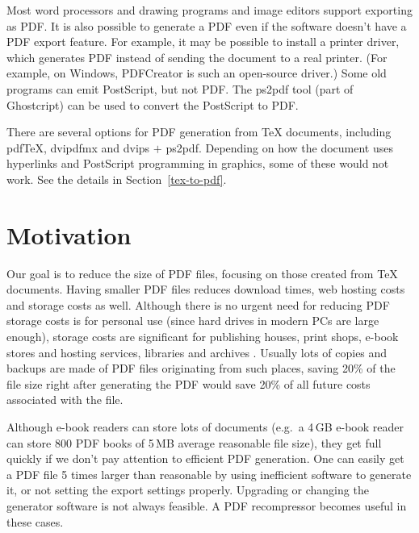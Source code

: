 \documentclass{ltugproc}
\def\cmd{\textsf}
\begin{document}
Most word processors and drawing programs and image editors support
exporting as PDF. It is also possible to generate a PDF even if the software
doesn't have a PDF export feature. For example, it may be possible to
install a printer driver, which generates PDF instead of sending the
document to a real printer. (For example, on Windows, PDFCreator
\cite{pdfcreator} is such an open-source driver.) Some old programs can emit
PostScript, but not PDF. The \cmd{ps2pdf} \cite{ps2df} tool (part of
Ghostcript) can be used to convert the PostScript to PDF.

There are several options for PDF generation from
\TeX{} documents, including
pdf\TeX{}, \cmd{dvipdfmx} and \cmd{dvips} $+$ \cmd{ps2pdf}. Depending on how
the document uses hyperlinks and PostScript programming in graphics, some of
these would not work. See the details in Section~\ref{tex-to-pdf}.

\section{Motivation}

Our goal is to reduce the size of PDF files, focusing on those
created from \TeX{} documents. Having smaller PDF files reduces download
times, web hosting costs and storage costs as well. Although there is no
urgent need for reducing PDF storage costs is for personal use (since hard
drives in modern PCs are large enough), storage costs are significant for
publishing houses, print shops, e-book stores and hosting services,
libraries and archives \cite{multivalent-article}.
Usually lots of copies and backups are made of PDF
files originating from such places, saving 20\% of the file size right after
generating the PDF would save 20\% of all future costs associated with the
file.

Although e-book readers can store lots of documents (e.g.\ a 4\,GB e-book
reader can store 800 PDF books of 5\,MB average reasonable file size), they
get full quickly if we don't pay attention to efficient PDF generation. One
can easily get a PDF file 5 times larger than reasonable by using
inefficient software to generate it, or not setting the export settings
properly. Upgrading or changing the generator software is not always
feasible. A PDF recompressor becomes useful in these cases.
\end{document}
